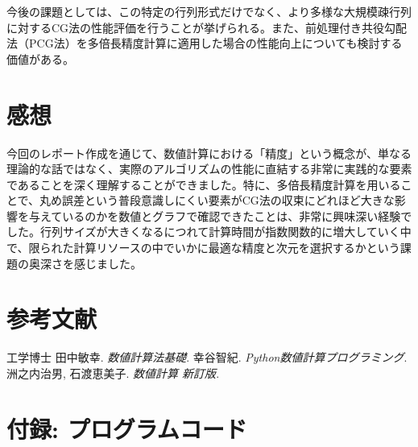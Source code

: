 \documentclass{article}
\begin{document}
今後の課題としては、この特定の行列形式だけでなく、より多様な大規模疎行列に対するCG法の性能評価を行うことが挙げられる。また、前処理付き共役勾配法（PCG法）を多倍長精度計算に適用した場合の性能向上についても検討する価値がある。

\section{感想}
今回のレポート作成を通じて、数値計算における「精度」という概念が、単なる理論的な話ではなく、実際のアルゴリズムの性能に直結する非常に実践的な要素であることを深く理解することができました。特に、多倍長精度計算を用いることで、丸め誤差という普段意識しにくい要素がCG法の収束にどれほど大きな影響を与えているのかを数値とグラフで確認できたことは、非常に興味深い経験でした。行列サイズが大きくなるにつれて計算時間が指数関数的に増大していく中で、限られた計算リソースの中でいかに最適な精度と次元を選択するかという課題の奥深さを感じました。

\section{参考文献}
\begin{thebibliography}{9}
 工学博士 田中敏幸. \textit{数値計算法基礎}.
 幸谷智紀. \textit{Python数値計算プログラミング}.
 洲之内治男, 石渡恵美子. \textit{数値計算 新訂版}.
\end{thebibliography}

\section{付録: プログラムコード}
\end{document}
